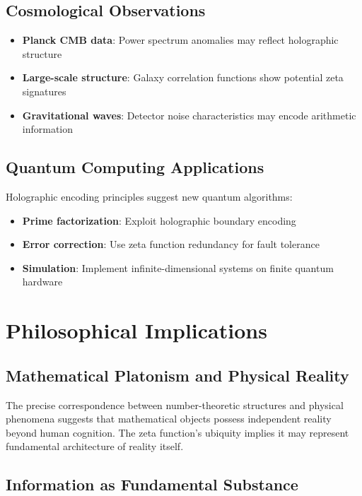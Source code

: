 \documentclass[12pt]{article}
\begin{document}
\subsection{Cosmological Observations}

\begin{itemize}
\item \textbf{Planck CMB data}: Power spectrum anomalies may reflect holographic structure
\item \textbf{Large-scale structure}: Galaxy correlation functions show potential zeta signatures
\item \textbf{Gravitational waves}: Detector noise characteristics may encode arithmetic information
\end{itemize}

\subsection{Quantum Computing Applications}

Holographic encoding principles suggest new quantum algorithms:

\begin{itemize}
\item \textbf{Prime factorization}: Exploit holographic boundary encoding
\item \textbf{Error correction}: Use zeta function redundancy for fault tolerance
\item \textbf{Simulation}: Implement infinite-dimensional systems on finite quantum hardware
\end{itemize}

\section{Philosophical Implications}

\subsection{Mathematical Platonism and Physical Reality}

The precise correspondence between number-theoretic structures and physical phenomena suggests that mathematical objects possess independent reality beyond human cognition. The zeta function's ubiquity implies it may represent fundamental architecture of reality itself.

\subsection{Information as Fundamental Substance}
\end{document}
